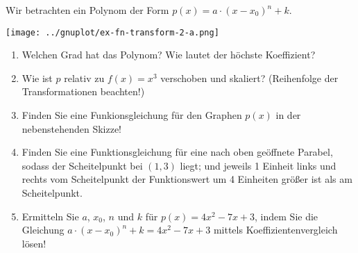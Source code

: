 \item Wir betrachten ein Polynom der Form $p(x) = a\cdot \left(x-x_0\right)^n+k$.

\begin{multicols}{2}
  \texttt{[image: ../gnuplot/ex-fn-transform-2-a.png]}

\begin{enumerate}
\item Welchen Grad hat das Polynom? Wie lautet der höchste Koeffizient?
\item Wie ist $p$ relativ zu $f(x)=x^3$ verschoben und skaliert? (Reihenfolge der Transformationen beachten!)
\item Finden Sie eine Funkionsgleichung für den Graphen $p(x)$ in der nebenstehenden Skizze! 
\item Finden Sie eine Funktionsgleichung für eine nach oben geöffnete Parabel, sodass der Scheitelpunkt bei $(1,3)$ liegt; und jeweils 1 Einheit links und rechts vom Scheitelpunkt der Funktionswert um 4 Einheiten größer ist als am Scheitelpunkt.
\item Ermitteln Sie $a$, $x_0$, $n$ und $k$ für $p(x)=4x^2-7x+3$, indem Sie die Gleichung $a\cdot \left(x-x_0\right)^n+k = 4x^2-7x+3$ mittels Koeffizientenvergleich lösen!
\end{enumerate}

\end{multicols}

